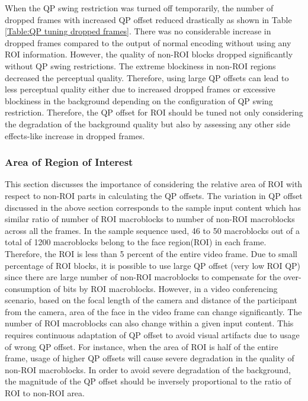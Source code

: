 \documentclass[11pt]{article} %
\begin{document}
When the QP swing restriction was turned off temporarily, the number of dropped frames with increased QP offset reduced drastically as shown in Table \ref{Table:QP tuning dropped frames}. There was no considerable increase in dropped frames compared to the output of normal encoding without using any ROI information. However, the quality of non-ROI blocks dropped significantly without QP swing restrictions. The extreme blockiness in non-ROI regions decreased the perceptual quality. Therefore, using large QP offsets can lead to less perceptual quality either due to increased dropped frames or excessive blockiness in the background depending on the configuration of QP swing restriction. Therefore, the QP offset for ROI should be tuned not only considering the degradation of the background quality but also by assessing any other side effects-like increase in dropped frames.
%
\subsubsection{Area of Region of Interest}
This section discusses the importance of considering the relative area of ROI with respect to non-ROI parts in calculating the QP offsets. The variation in QP offset discussed in the above section corresponds to the sample input content which has similar ratio of number of ROI macroblocks to number of non-ROI macroblocks across all the frames. In the sample sequence used, 46 to 50 macroblocks out of a total of 1200 macroblocks belong to the face region(ROI) in each frame. Therefore, the ROI is less than 5 percent of the entire video frame. Due to small percentage of ROI blocks, it is possible to use large QP offset (very low ROI QP) since there are large number of non-ROI macroblocks to compensate for the over-consumption of bits by ROI macroblocks. However, in a video conferencing scenario,  based on the focal length of the camera and distance of the participant from the camera, area of the face in the video frame can change significantly. The number of ROI macroblocks can also change within a given input content. This requires continuous adaptation of QP offset to avoid visual artifacts due to usage of wrong QP offset. For instance, when the area of ROI is half of the entire frame, usage of higher QP offsets will cause severe degradation in the quality of non-ROI macroblocks. In order to avoid severe degradation of the background, the magnitude of the QP offset should be inversely proportional to the ratio of ROI to non-ROI area.
\end{document}
